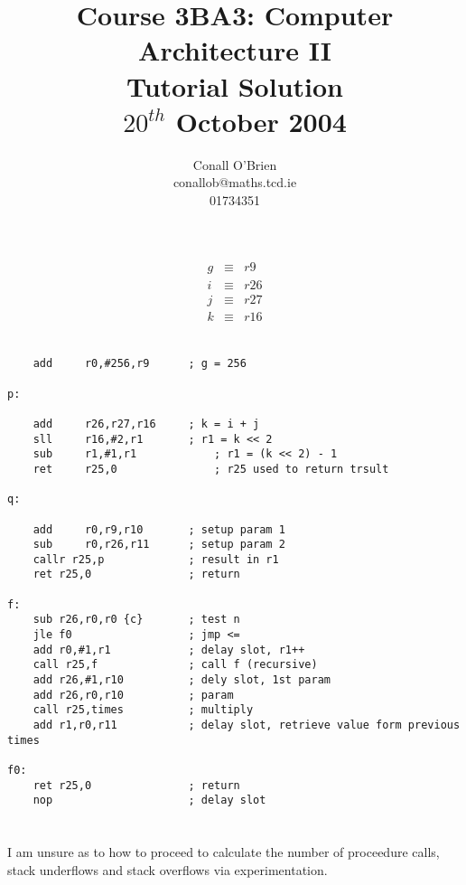 \documentclass[a4paper,12pt]{article}
\begin{document}
\title{Course 3BA3: Computer Architecture II \\ Tutorial Solution\\ $20^{th}$ October 2004}

\author{Conall O'Brien \\ conallob@maths.tcd.ie \\ 01734351}

\maketitle

\section{}

\begin{eqnarray*}
g & \equiv & r9 \\
i & \equiv & r26 \\
j & \equiv & r27 \\
k & \equiv & r16 \\
\end{eqnarray*}

\begin{verbatim}

	add 	r0,#256,r9		; g = 256

p:

	add 	r26,r27,r16		; k = i + j
	sll 	r16,#2,r1		; r1 = k << 2
	sub 	r1,#1,r1			; r1 = (k << 2) - 1
	ret 	r25,0				; r25 used to return trsult

q:

	add 	r0,r9,r10		; setup param 1
	sub 	r0,r26,r11		; setup param 2
	callr r25,p				; result in r1
	ret	r25,0				; return

f:
	sub r26,r0,r0 {c}		; test n
	jle f0					; jmp <=
	add r0,#1,r1			; delay slot, r1++
	call r25,f				; call f (recursive)
	add r26,#1,r10			; dely slot, 1st param
	add r26,r0,r10			; param
	call r25,times			; multiply
	add r1,r0,r11			; delay slot, retrieve value form previous times

f0:
	ret r25,0				; return
	nop						; delay slot

\end{verbatim}

\section{}

I am unsure as to how to proceed to calculate the number of proceedure
calls, stack underflows and stack overflows via experimentation.
\end{document}
